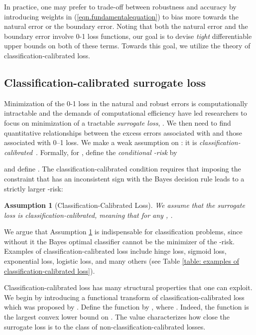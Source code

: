 \documentclass[11pt]{article}
\newtheorem{assumption}{Assumption}
\newcommand{\0}{\mathbf{0}}
\newcommand{\1}{\mathbf{1}}
\begin{document}
\medskip
{}
In practice, one may prefer to trade-off between robustness and accuracy by introducing weights in (\ref{eqn.fundamentalequation}) to bias more towards the natural error or the boundary error. Noting that both the natural error and the boundary error involve 0-1 loss functions, our goal is to devise \emph{tight} differentiable upper bounds on both of these terms. Towards this goal, we utilize the theory of classification-calibrated loss. 










\subsection{Classification-calibrated surrogate loss}

Minimization of the 0-1 loss in the natural and robust errors is computationally intractable and the demands of computational efficiency have led researchers to focus on minimization of a tractable \emph{surrogate loss}, .  We then need to find quantitative relationships between the excess errors associated with  and those associated with 0–1 loss. We make a weak assumption on : it is \emph{classification-calibrated}~\cite{bartlett2006convexity}.  Formally, for , define the \emph{conditional -risk} by

and define . The classification-calibrated condition requires that imposing the
constraint that  has an inconsistent sign with the Bayes decision rule  leads to a strictly larger -risk:
\begin{assumption}[Classification-Calibrated Loss]
\label{assumption: classification-calibrated}
We assume that the surrogate loss  is classification-calibrated, meaning that for any , .
\end{assumption}
We argue that Assumption \ref{assumption: classification-calibrated} is indispensable for classification problems, since without it the Bayes optimal classifier cannot be the minimizer of the -risk.
Examples of classification-calibrated loss include hinge loss, sigmoid loss, exponential loss, logistic loss, and many others (see Table \ref{table: examples of classification-calibrated loss}).

\medskip
{} Classification-calibrated loss has many structural properties that one can exploit. We begin by introducing a functional transform of classification-calibrated loss  which was proposed by \cite{bartlett2006convexity}.  Define the function  by , where
. Indeed, the function  is the largest convex lower bound on . The value  characterizes how close the surrogate loss  is to the class of non-classification-calibrated losses.
\end{document}
